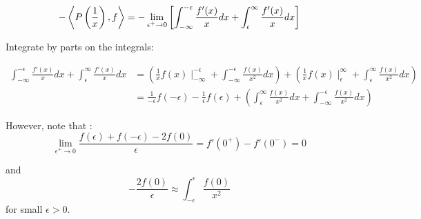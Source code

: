 \documentclass[12pt]{article}%
\newcommand{\disip}[2]{\left\langle #1, #2 \right\rangle}
\newcommand{\posinfint}[1][0]{\int_{#1}^\infty}
\newcommand{\neginfint}[1][0]{\int_{-\infty}^{#1}}
\begin{document}
\begin{enumerate}
  \begin{align*}
      -\disip{\prinval{\frac{1}{x}}}{f} = - \lim_{\epsilon^+ \rightarrow 0} \left[ \int_{-\infty}^{-\epsilon} \frac{f'(x)}{x}dx + \posinfint[\epsilon] \frac{f'(x)}{x}dx\right] \\
  \end{align*}

  Integrate by parts on the integrals:

    \begin{align*}
        \int_{-\infty}^{-\epsilon} \frac{f'(x)}{x}dx + \posinfint[\epsilon] \frac{f'(x)}{x}dx & = \left( \frac{1}{x}f(x)\mid_{-\infty}^{-\epsilon} + \neginfint[-\epsilon] \frac{f(x)}{x^2} dx \right) + \left( \frac{1}{x}f(x)\mid_{\epsilon}^{\infty} + \posinfint[\epsilon] \frac{f(x)}{x^2} dx \right) \\
        & = \frac{1}{-\epsilon}f(-\epsilon) - \frac{1}{\epsilon}f(\epsilon) + \left(\posinfint[\epsilon] \frac{f(x)}{x^2} dx + \neginfint[-\epsilon] \frac{f(x)}{x^2} dx \right)
    \end{align*}

    However, note that :
    \[ \lim_{\epsilon^+ \rightarrow 0} \frac{f(\epsilon) + f(-\epsilon) - 2f(0)}{\epsilon} = f'(0^+) - f'(0^-) = 0\]

    and
    \[ - \frac{2f(0)}{\epsilon} \approx \int_{-\epsilon}^{\epsilon} \frac{f(0)}{x^2} \]
    for small $\epsilon >0$.



\end{enumerate}
\end{document}
